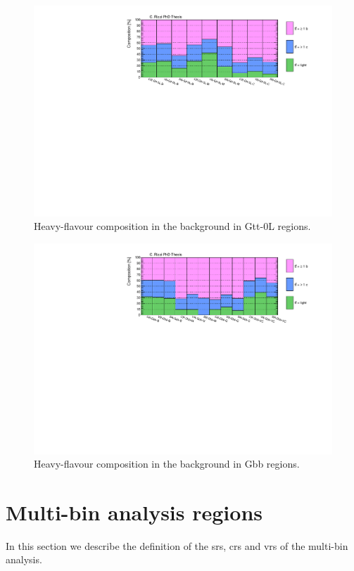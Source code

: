 \begin{figure}[htbp]
\includegraphics[width=\textwidth]{figures/strong_prod/comp_plots/Gtt_0L_HF.pdf}
\caption{Heavy-flavour composition in the \ttbar background in Gtt-0L regions.}
	\label{fig:HFcomp_Gtt0L}
\end{figure}

\begin{figure}[htbp]
\includegraphics[width=\textwidth]{figures/strong_prod/comp_plots/Gbb_HF.pdf}
\caption{Heavy-flavour composition in the \ttbar background in Gbb regions.}
	\label{fig:HFcomp_Gbb}
\end{figure}


\FloatBarrier

\section{Multi-bin analysis regions}
\label{sec:strong:multibin}
In this section we describe the definition of the \glspl{sr}, \glspl{cr} and \glspl{vr} 
of the multi-bin analysis. 

